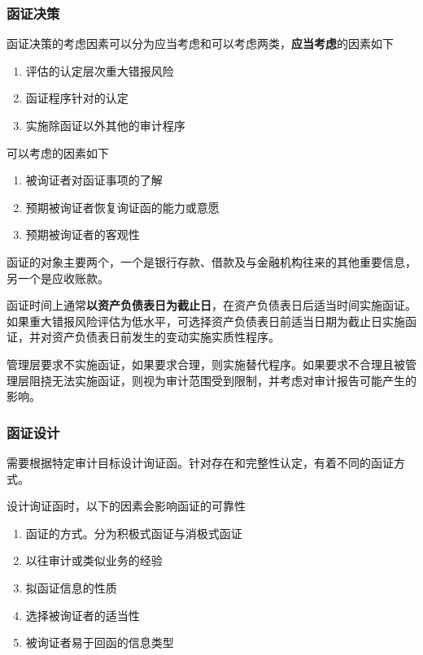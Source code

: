 \documentclass[UTF8,12pt]{ctexart}
\numberwithin{equation}{section} %
\numberwithin{figure}{section}
\numberwithin{table}{section}
\begin{document}
	\subsubsection{函证决策}
	函证决策的考虑因素可以分为应当考虑和可以考虑两类，\textbf{应当考虑}的因素如下
	\begin{enumerate}
		\item 评估的认定层次重大错报风险
		
		\item 函证程序针对的认定
		
		\item 实施除函证以外其他的审计程序
	\end{enumerate}
	
	可以考虑的因素如下
	\begin{enumerate}
		\item 被询证者对函证事项的了解
		
		\item 预期被询证者恢复询证函的能力或意愿
		
		\item 预期被询证者的客观性
	\end{enumerate}
	
	函证的对象主要两个，一个是银行存款、借款及与金融机构往来的其他重要信息，另一个是应收账款。
	
	函证时间上通常\textbf{以资产负债表日为截止日}，在资产负债表日后适当时间实施函证。如果重大错报风险评估为低水平，可选择资产负债表日前适当日期为截止日实施函证，并对资产负债表日前发生的变动实施实质性程序。
	
	管理层要求不实施函证，如果要求合理，则实施替代程序。如果要求不合理且被管理层阻挠无法实施函证，则视为审计范围受到限制，并考虑对审计报告可能产生的影响。
	
	\subsubsection{函证设计}
	需要根据特定审计目标设计询证函。针对存在和完整性认定，有着不同的函证方式。
	
	设计询证函时，以下的因素会影响函证的可靠性
	\begin{enumerate}
		\item 函证的方式。分为积极式函证与消极式函证
		
		\item 以往审计或类似业务的经验
		
		\item 拟函证信息的性质
		
		\item 选择被询证者的适当性
		
		\item 被询证者易于回函的信息类型
	\end{enumerate}
	
\end{document}
